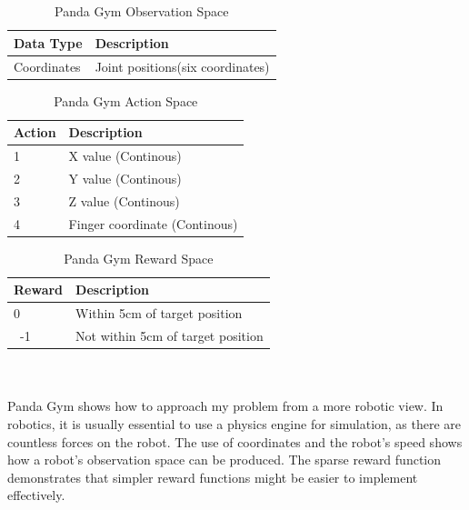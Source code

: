 \documentclass[a4paper,12pt]{article}
\begin{document}
\\\\
\begin{table}[H]
\centering
\caption{Panda Gym Observation Space}
\label{tab:Panda Gym Observation Space}
\begin{tabular}{|ll|}
\hline
\textbf{Data Type} & \textbf{Description}\\ \hline
Coordinates & Joint positions(six coordinates) \\ \hline
\end{tabular}
\end{table}

\begin{table}[H]
\centering
\caption{Panda Gym Action Space}
\label{tab:Panda Gym Action Space}
\begin{tabular}{|ll|}
\hline
\textbf{Action} & \textbf{Description}\\ \hline
1 & X value (Continous)\\ 
2 & Y value (Continous)\\ 
3 & Z value (Continous)\\ 
4 & Finger coordinate (Continous)\\ \hline
\end{tabular}
\end{table}

\begin{table}[H]
\centering
\caption{Panda Gym Reward Space}
\label{tab:Panda Gym Reward Space}
\begin{tabular}{|ll|}
\hline
\textbf{Reward} & \textbf{Description}\\ \hline
0 & Within 5cm of target position\\ \
-1 & Not within 5cm of target position \\ \hline
\end{tabular}
\end{table}
\\\\
Panda Gym shows how to approach my problem from a more robotic view. In robotics, it is usually essential to use a physics engine for simulation, as there are countless forces on the robot. The use of coordinates and the robot's speed shows how a robot's observation space can be produced. The sparse reward function demonstrates that simpler reward functions might be easier to implement effectively.
\end{document}
